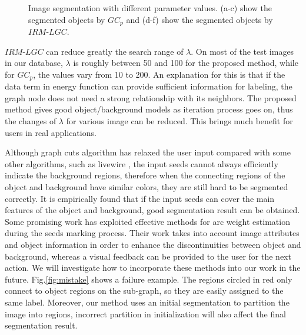 \begin{figure}[htp]
        \centering
        \caption{
        Image segmentation with different parameter values. (a-c) show the segmented objects by $GC_p$ and (d-f)
        show the segmented objects by $IRM$-$LGC$. }
        \label{IGC:fig:lambda2}
        \end{figure}

 $IRM$-$LGC$ can reduce greatly the search range of $\lambda$. On most of the test images in our
 database, $\lambda$ is roughly between 50 and 100 for the proposed method, while for $GC_p$,
 the values vary from 10 to 200. An explanation for this is that if the data term in energy function can provide sufficient information for labeling, the graph node does not need a strong relationship with its neighbors. The proposed method gives good object/background models as iteration process goes on, thus the changes of $\lambda$ for various image can be reduced. This brings much benefit for users in real applications.

  Although graph cuts algorithm has relaxed the user input compared with some other algorithms,
  such as livewire \cite{Falaco98}, the input seeds cannot always efficiently indicate the background regions,
  therefore when the connecting regions of the object and background have similar colors, they
  are still hard to be segmented correctly. It is empirically found that if the input seeds
  can cover the main features of the object and background, good segmentation result can be
  obtained.
  Some promising work \cite{R1,R5} has exploited effective methods for arc
weight estimation during the seeds marking process. Their work takes
into account image attributes and object information in order to
enhance the discontinuities between object and background, whereas a
visual feedback can be provided to the user for the next action. We
will investigate how to incorporate these methods into our work in
the future. Fig.\ref{fig:mistake} shows a failure example. The
regions circled in red only connect to object regions on the
sub-graph, so they are easily assigned to the same label. Moreover,
our method uses an initial segmentation to partition the image into
regions, incorrect partition in initialization will also affect the
final segmentation result.

